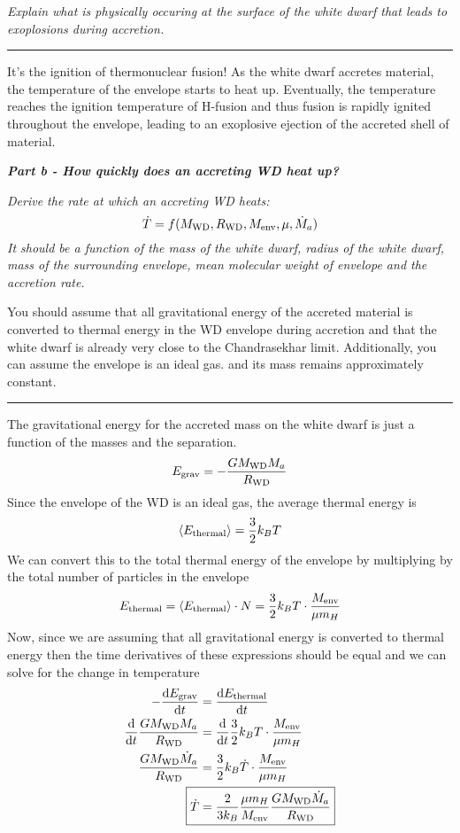\documentclass[12pt, letterpaper, twoside]{article}
\newcommand{\question}[1]{{\noindent \it #1}}
\newcommand{\answer}[1]{
    \par\noindent\rule{\textwidth}{0.4pt}#1\vspace{0.5cm}
}
\newcommand{\avg}[1]{\left\langle #1 \right\rangle}
\begin{document}
\question{Explain what is physically occuring at the surface of the white dwarf that leads to exoplosions during accretion.}

\answer{
    It's the ignition of thermonuclear fusion! As the white dwarf accretes material, the temperature of the envelope starts to heat up. Eventually, the temperature reaches the ignition temperature of H-fusion and thus fusion is rapidly ignited throughout the envelope, leading to an exoplosive ejection of the accreted shell of material.
}

\clearpage

\question{\textbf{Part b - How quickly does an accreting WD heat up?}}

\question{Derive the rate at which an accreting WD heats:
\begin{equation}
    \dot{T} = f(M_{\rm WD}, R_{\rm WD}, M_{\rm env}, \mu, \dot{M}_a)
\end{equation}
It should be a function of the mass of the white dwarf, radius of the white dwarf, mass of the surrounding envelope, mean molecular weight of envelope and the accretion rate.

You should assume that all gravitational energy of the accreted material is converted to thermal energy in the WD envelope during accretion and that the white dwarf is already very close to the Chandrasekhar limit. Additionally, you can assume the envelope is an ideal gas. and its mass remains approximately constant.}

\answer{
    The gravitational energy for the accreted mass on the white dwarf is just a function of the masses and the separation.
    \begin{equation}
        E_{\rm grav} = - \frac{G M_{\rm WD} M_a}{R_{\rm WD}}
    \end{equation}
    Since the envelope of the WD is an ideal gas, the average thermal energy is
    \begin{equation}
        \avg{E_{\rm thermal}} = \frac{3}{2} k_B T
    \end{equation}
    We can convert this to the total thermal energy of the envelope by multiplying by the total number of particles in the envelope
    \begin{equation}
        E_{\rm thermal} = \avg{E_{\rm thermal}} \cdot N = \frac{3}{2} k_B T \cdot \frac{M_{\rm env}}{\mu m_H}
    \end{equation}
    Now, since we are assuming that all gravitational energy is converted to thermal energy then the time derivatives of these expressions should be equal and we can solve for the change in temperature
    \begin{align}
        - \dv{E_{\rm grav}}{t} &= \dv{E_{\rm thermal}}{t} \\
        \dv{t} \frac{G M_{\rm WD} M_a}{R_{\rm WD}} &= \dv{t} \frac{3}{2} k_B T \cdot \frac{M_{\rm env}}{\mu m_H} \\
        \frac{G M_{\rm WD} \dot{M}_a}{R_{\rm WD}} &= \frac{3}{2} k_B \dot{T} \cdot \frac{M_{\rm env}}{\mu m_H} \\
        \Aboxed{ \dot{T} &= \frac{2}{3 k_B} \frac{\mu m_H}{M_{\rm env}} \frac{G M_{\rm WD} \dot{M}_a}{R_{\rm WD}} }
    \end{align}
}
\end{document}
